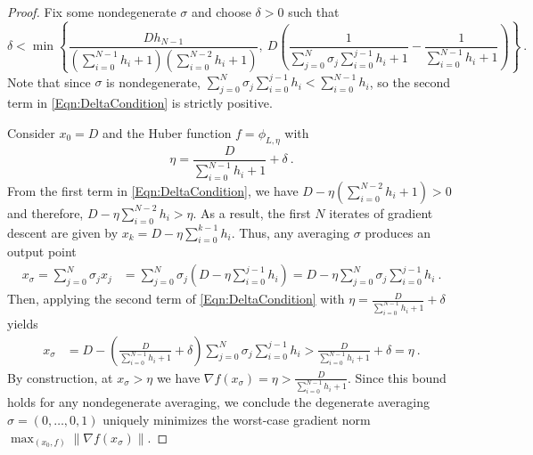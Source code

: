 \documentclass[11pt]{article}
\numberwithin{equation}{section}
\theoremstyle{definition}
\theoremstyle{definition}
\theoremstyle{definition}
\newcommand{\1}{\mathbf{1}}
\newcommand{\xSpecial}{x_\sigma}
\newcommand{\sumH}[1]{\sum_{i=0}^{#1} h_i}
\newcommand{\sumSigH}{\sum_{j=0}^N \sigma_j \sum_{i=0}^{j-1} h_i}
\begin{document}
\begin{proof}
    Fix some nondegenerate $\sigma$ and choose $\delta>0$ such that
    \begin{equation}\label{Eqn:DeltaCondition}
        \delta < \min \left\{\frac{D h_{N-1}}{(\sumH{N-1}+1)(\sumH{N-2}+1)}, \ D\left(\frac{1}{\sumSigH + 1} - \frac{1}{\sumH{N-1} + 1}\right) \right\} \ .
    \end{equation}
    Note that since $\sigma$ is nondegenerate, $\sumSigH < \sumH{N-1}$, so the second term in \eqref{Eqn:DeltaCondition} is strictly positive.

    Consider $x_0=D$ and the Huber function $f= \phi_{L,\eta}$ with
    \begin{equation*}
        \eta = \frac{D}{\sum_{i=0}^{N-1}h_i +1} +\delta \ .
    \end{equation*}
    From the first term in \eqref{Eqn:DeltaCondition}, we have $D - \eta (\sumH{N-2} + 1) > 0$ and therefore, $D-\eta\sumH{N-2} > \eta$. As a result, the first $N$ iterates of gradient descent are given by $x_k = D - \eta\sumH{k-1}$. Thus, any averaging $\sigma$ produces an output point
    \begin{align*}
        \xSpecial = \sum_{j=0}^{N} \sigma_j x_j & = \sum_{j=0}^N \sigma_j (D-\eta\sum_{i=0}^{j-1}h_i) = D-\eta\sumSigH \ .
    \end{align*}
    Then, applying the second term of \eqref{Eqn:DeltaCondition} with $\eta = \frac{D}{\sum_{i=0}^{N-1}h_i +1} +\delta$ yields
    \begin{align*}
        \xSpecial & = D- \left(\frac{D}{\sum_{i=0}^{N-1}h_i +1} +\delta\right)\sumSigH > \frac{D}{\sumH{N-1} +1} + \delta = \eta \ . 
    \end{align*}
    By construction, at $\xSpecial > \eta$ we have $\nabla f(\xSpecial) = \eta > \frac{D}{\sumH{N-1} +1}$. Since this bound holds for any nondegenerate averaging, we conclude the degenerate averaging $\sigma = (0,\dots,0,1)$ uniquely minimizes the worst-case gradient norm $\max_{(x_0,f)}\|\nabla f(\xSpecial)\|$.
\end{proof}
\end{document}
